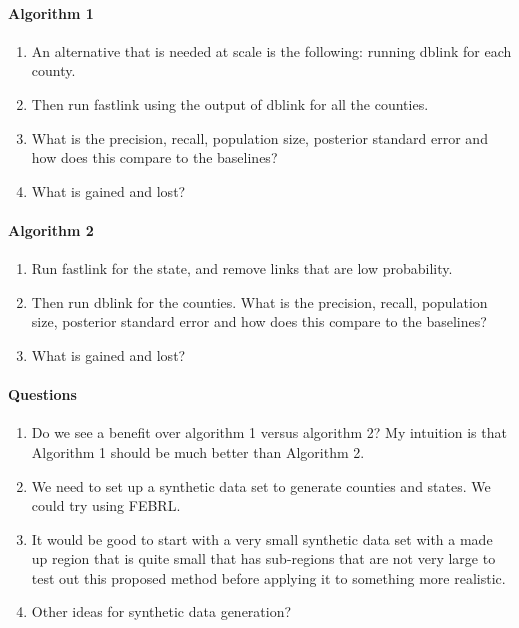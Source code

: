 \documentclass[12pt]{article}\usepackage[]{graphicx}\usepackage[]{color}
\begin{document}
\paragraph{Algorithm 1}
\begin{enumerate}
\item An alternative that is needed at scale is the following: running dblink for each county. 
\item Then run fastlink using the output of dblink for all the counties. 
\item What is the precision, recall, population size, posterior standard error and how does this compare to the baselines? 
\item What is gained and lost? 
\end{enumerate}

\paragraph{Algorithm 2}
\begin{enumerate}
\item Run fastlink for the state, and remove links that are low probability. 
\item Then run dblink for the counties. What is the precision, recall, population size, posterior standard error and how does this compare to the baselines? 
\item What is gained and lost? 
\end{enumerate}

\paragraph{Questions}

\begin{enumerate}
\item Do we see a benefit over algorithm 1 versus algorithm 2? My intuition is that Algorithm 1 should be much better than Algorithm 2. 
\item We need to set up a synthetic data set to generate counties and states. We could try using FEBRL. 
\item It would be good to start with a very small synthetic data set with a made up region that is quite small that has sub-regions that are not very large to test out this proposed method before applying it to something more realistic. 
\item Other ideas for synthetic data generation?
\end{enumerate}
\end{document}
